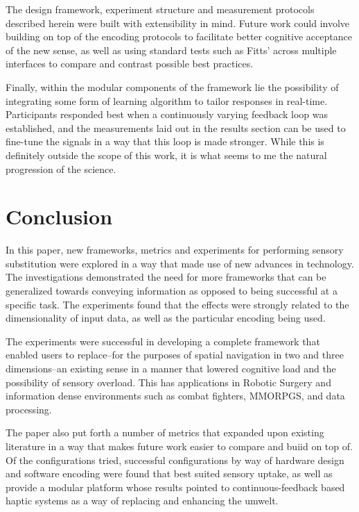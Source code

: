 \documentclass[
hidelinks,
12pt, %
oneside, %
english, %
doublespacing, %
headsepline, %
]{MastersDoctoralThesis} %
\begin{document}
The design framework, experiment structure and measurement protocols described herein were built with extensibility in mind. Future work could involve building on top of the encoding protocols to facilitate better cognitive acceptance of the new sense, as well as using standard tests such as Fitts' across multiple interfaces to compare and contrast possible best practices.

Finally, within the modular components of the framework lie the possibility of integrating some form of learning algorithm to tailor responses in real-time. Participants responded best when a continuously varying feedback loop was established, and the measurements laid out in the results section can be used to fine-tune the signals in a way that this loop is made stronger. While this is definitely outside the scope of this work, it is what seems to me the natural progression of the science.

\section{Conclusion}

In this paper, new frameworks, metrics and experiments for performing sensory substitution were explored in a way that made use of new advances in technology. The investigations demonstrated the need for more frameworks that can be generalized towards conveying information as opposed to being successful at a specific task. The experiments found that the effects were strongly related to the dimensionality of input data, as well as the particular encoding being used.

The experiments were successful in developing a complete framework that enabled users to replace--for the purposes of spatial navigation in two and three dimensions--an existing sense in a manner that lowered cognitive load and the possibility of sensory overload. This has applications in Robotic Surgery and information dense environments such as combat fighters, MMORPGS, and data processing.

The paper also put forth a number of metrics that expanded upon existing literature in a way that makes future work easier to compare and buiid on top of. Of the configurations tried, successful configurations by way of hardware design and software encoding were found that best suited sensory uptake, as well as provide a modular platform whose results pointed to continuous-feedback based haptic systems as a way of replacing and enhancing the umwelt.
\end{document}
